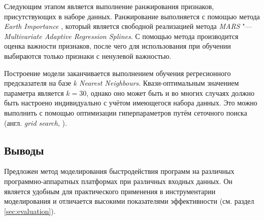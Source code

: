 Следующим этапом является выполнение ранжирования признаков, присутствующих в наборе данных. Ранжирование выполняется с помощью метода \textit{Earth Importance} \cite{earth-importance}, который является свободной реализацией метода \textit{MARS} "--- \textit{Multivariate Adaptive Regression Splines}. С помощью метода производится оценка важности признаков, после чего для использования при обучении выбираются только признаки с ненулевой важностью.

Построение модели заканчивается выполнением обучения регресионного предсказателя на базе \textit{k Nearest Neighbours}. Квази-оптимальным значением параметра является $k = 30$, однако оно может быть и во многих случаях должно быть настроено индивидуально с учётом имеющегося набора данных. Это можно выполнить с помощью оптимизации гиперпараметров путём сеточного поиска (англ. \textit{grid search}, \cite{grid-search}).

\subsection{Выводы}
Предложен метод моделирования быстродействия программ на различных программно-аппаратных платформах при различных входных данных. Он является удобным для практического применения в инструментарии моделирования и отличается высокими показателями эффективности (см. раздел \ref{sec:evaluation}).